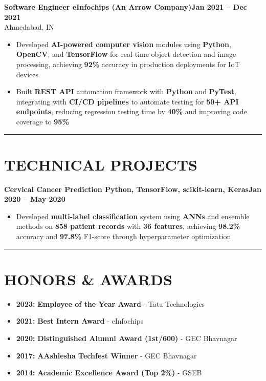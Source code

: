\documentclass[10pt,a4paper]{article}
\begin{document}
{\vspace{2pt}
\noindent
\textbf{Software Engineer \textbf{\textbar{}} eInfochips (An Arrow Company)}\hfill\textbf{Jan 2021 -- Dec 2021}\\[-2pt]
{\small Ahmedabad, IN}
\begin{itemize}[leftmargin=0.3in, itemsep=1.5pt, topsep=0pt, parsep=0pt, partopsep=0pt, label=$\circ$]
    \item Developed \textbf{AI-powered computer vision} modules using \textbf{Python}, \textbf{OpenCV}, and \textbf{TensorFlow} for real-time object detection and image processing, achieving \textbf{92\%} accuracy in production deployments for IoT devices
    \item Built \textbf{REST API} automation framework with \textbf{Python} and \textbf{PyTest}, integrating with \textbf{CI/CD pipelines} to automate testing for \textbf{50+ API endpoints}, reducing regression testing time by \textbf{40\%} and improving code coverage to \textbf{95\%}
\end{itemize}
}

\vspace{2pt}
\noindent\rule{\textwidth}{0.8pt}

\section*{TECHNICAL PROJECTS}

{\small
\noindent
\textbf{Cervical Cancer Prediction \textbf{\textbar{}} Python, TensorFlow, scikit-learn, Keras}\hfill\textbf{Jan 2020 -- May 2020}
\begin{itemize}[leftmargin=0.3in, itemsep=1.5pt, topsep=0pt, parsep=0pt, partopsep=0pt, label=$\circ$]
    \item Developed \textbf{multi-label classification} system using \textbf{ANNs} and ensemble methods on \textbf{858 patient records} with \textbf{36 features}, achieving \textbf{98.2\%} accuracy and \textbf{97.8\%} F1-score through hyperparameter optimization
\end{itemize}
}

\vspace{2pt}
\noindent\rule{\textwidth}{0.8pt}

\section*{HONORS \& AWARDS}

{\small
\begin{itemize}[leftmargin=0.15in, itemsep=1.5pt, topsep=0pt, parsep=0pt, partopsep=0pt, label=$\bullet$]
    \item \textbf{2023:} \textbf{Employee of the Year Award} - Tata Technologies
    \item \textbf{2021:} \textbf{Best Intern Award} - eInfochips
    \item \textbf{2020:} \textbf{Distinguished Alumni Award (1st/600)} - GEC Bhavnagar
    \item \textbf{2017:} \textbf{AAshlesha Techfest Winner} - GEC Bhavnagar
    \item \textbf{2014:} \textbf{Academic Excellence Award (Top 2\%)} - GSEB
\end{itemize}
}
\end{document}
